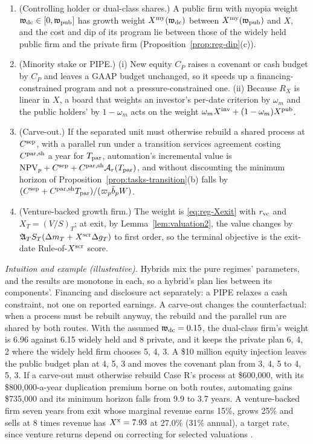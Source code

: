 \begin{proposition}[Hybrids]\label{prop:reg-hybrid}
\begin{enumerate}
\item[(a)] (Controlling holder or dual-class shares.) A public firm with myopia weight $\mathfrak w_{\rm dc}\in[0,\mathfrak w_{\rm pub}]$ has growth weight $X^{\rm my}(\mathfrak w_{\rm dc})$ between $X^{\rm my}(\mathfrak w_{\rm pub})$ and $X$, and the cost and dip of its program lie between those of the widely held public firm and the private firm (Proposition~\ref{prop:reg-dip}(c)).
\item[(b)] (Minority stake or PIPE.) (i) New equity $C_P$ raises a covenant or cash budget by $C_P$ and leaves a GAAP budget unchanged, so it speeds up a financing-constrained program and not a pressure-constrained one. (ii) Because $R_X$ is linear in $X$, a board that weights an investor's per-date criterion by $\omega_m$ and the public holders' by $1-\omega_m$ acts on the weight $\omega_mX^{\rm inv}+(1-\omega_m)X^{\rm pub}$.
\item[(c)] (Carve-out.) If the separated unit must otherwise rebuild a shared process at $C^{\rm sep}$, with a parallel run under a transition services agreement costing $C^{\rm par,sh}$ a year for $T_{\rm par}$, automation's incremental value is $\mathrm{NPV}_p+C^{\rm sep}+C^{\rm par,sh}\mathcal A_r(T_{\rm par})$, and without discounting the minimum horizon of Proposition~\ref{prop:tasks-transition}(b) falls by $(C^{\rm sep}+C^{\rm par,sh}T_{\rm par})/(\varpi_p\bar b_pW)$.
\item[(d)] (Venture-backed growth firm.) The weight is \eqref{eq:reg-Xexit} with $r_{\rm vc}$ and $X_T=(V/S)_T$; at exit, by Lemma~\ref{lem:valuation2}, the value changes by $\mathfrak A_TS_T(\Delta m_T+X^{\rm scr}\Delta g_T)$ to first order, so the terminal objective is the exit-date Rule-of-$X^{\rm scr}$ score.
\end{enumerate}
\end{proposition}

\noindent\emph{Intuition and example (illustrative).} Hybrids mix the pure regimes' parameters, and the results are monotone in each, so a hybrid's plan lies between its components'. Financing and disclosure act separately: a PIPE relaxes a cash constraint, not one on reported earnings. A carve-out changes the counterfactual: when a process must be rebuilt anyway, the rebuild and the parallel run are shared by both routes. With the assumed $\mathfrak w_{\rm dc}=0.15$, the dual-class firm's weight is 6.96 against 6.15 widely held and 8 private, and it keeps the private plan 6, 4, 2 where the widely held firm chooses 5, 4, 3. A \$10 million equity injection leaves the public budget plan at 4, 5, 3 and moves the covenant plan from 3, 4, 5 to 4, 5, 3. If a carve-out must otherwise rebuild Case R's process at \$600{,}000, with its \$800{,}000-a-year duplication premium borne on both routes, automating gains \$735{,}000 and its minimum horizon falls from 9.9 to 3.7 years. A venture-backed firm seven years from exit whose marginal revenue earns 15\%, grows 25\% and sells at 8 times revenue has $X^{\rm x}=7.93$ at 27.0\% (31\% annual), a target rate, since venture returns depend on correcting for selected valuations \citep{cochrane2005risk,korteweg2010risk}.

